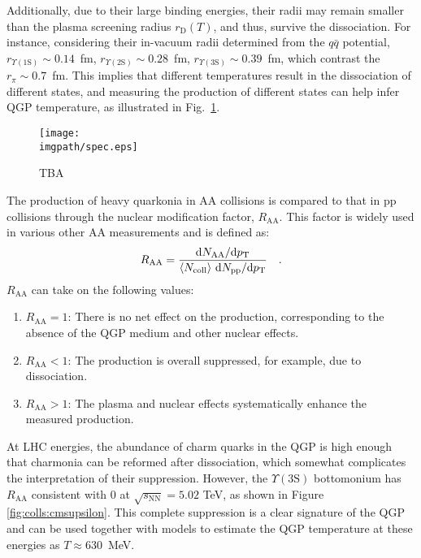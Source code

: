 Additionally, due to their large binding energies, their radii may remain smaller than the plasma screening radius $r_\mathrm{D}(T)$, and thus, survive the dissociation. For instance, considering their in-vacuum radii determined from the $q\bar{q}$ potential, $r_{\Upsilon(1\mathrm{S})}\sim 0.14$~fm, $r_{\Upsilon(2\mathrm{S})}\sim 0.28$~fm, $r_{\Upsilon(3\mathrm{S})}\sim 0.39$~fm, which contrast the $r_\pi \sim 0.7$~fm. This implies that different temperatures result in the dissociation of different states, and measuring the production of different states can help infer QGP temperature, as illustrated in Fig.~\ref{fig:colls:thermometer}.

\begin{figure}[H]
\texttt{[image: \\imgpath/spec.eps]}
\caption{TBA}
\label{fig:colls:thermometer}
\end{figure}

The production of heavy quarkonia in AA collisions is compared to that in pp collisions through the nuclear modification factor, $R_{\mathrm{AA}}$. This factor is widely used in various other AA measurements and is defined as:
\begin{align}
R_{\mathrm{AA}}=\frac{\mathrm{d}N_{\mathrm{AA}}/\mathrm{d}p_{\text{T}}}{\langle N_{\mathrm{coll}}\rangle\ \mathrm{d}N_{\mathrm{pp}}/\mathrm{d}p_{\text{T}}} \quad .
\end{align}
$R_{\mathrm{AA}}$ can take on the following values:
\begin{enumerate}
\item $R_\mathrm{AA} = 1$: There is no net effect on the production, corresponding to the absence of the QGP medium and other nuclear effects.
\item $R_\mathrm{AA} < 1$: The production is overall suppressed, for example, due to dissociation.
\item $R_\mathrm{AA} > 1$: The plasma and nuclear effects systematically enhance the measured production.
\end{enumerate}

At LHC energies, the abundance of charm quarks in the QGP is high enough that charmonia can be reformed after dissociation, which somewhat complicates the interpretation of their suppression. However, the $\Upsilon(3\mathrm{S})$ bottomonium has $R_{\mathrm{AA}}$ consistent with 0 at $\sqrt{s_{\mathrm{NN}}}=5.02$ TeV, as shown in Figure \ref{fig:colls:cmsupsilon}. This complete suppression is a clear signature of the QGP and can be used together with models to estimate the QGP temperature at these energies as $T\approx 630$~MeV.

